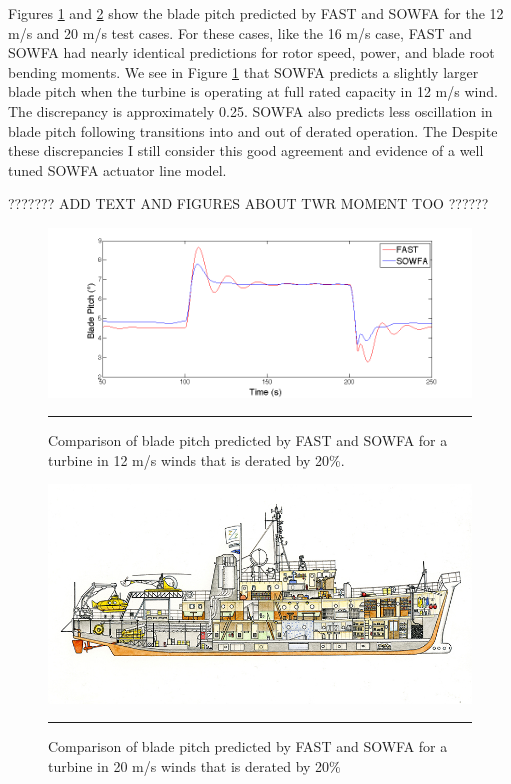 Figures \ref{fig6-7} and \ref{fig6-8} show the blade pitch predicted by FAST and SOWFA for the  12 m/s and 20 m/s test cases. For these cases, like the 16 m/s case, FAST and SOWFA had nearly identical predictions for rotor speed, power, and blade root bending moments. We see in Figure \ref{fig6-7} that SOWFA predicts a slightly larger blade pitch when the turbine is operating at full rated capacity in 12 m/s wind. The discrepancy is approximately 0.25\degree . SOWFA also predicts less oscillation in blade pitch following transitions into and out of derated operation. The Despite these discrepancies I still consider this good agreement and evidence of a well tuned SOWFA actuator line model.   


??????? ADD TEXT AND FIGURES ABOUT TWR MOMENT TOO   ?????? 



\begin{figure}[htbp] \label{fig6-7}
	\centering
		\includegraphics[trim = {1cm 0 2cm 0}, clip, width = \linewidth]{Figures/ch6Figures/fig6-7.png}
		\rule{35em}{0.5pt}
	\caption{Comparison of blade pitch predicted by FAST and SOWFA for a turbine in 12 m/s winds that is derated by 20\%.}
\end{figure}

\begin{figure}[htbp]	\label{fig6-8}
	\centering
		\includegraphics[trim = {1cm 0 2cm 0}, clip, width = \linewidth]{Figures/ch6Figures/fig6-p.png}
		\rule{35em}{0.5pt}
	\caption{Comparison of blade pitch predicted by FAST and SOWFA for a turbine in 20 m/s winds that is derated by 20\%}
\end{figure}

